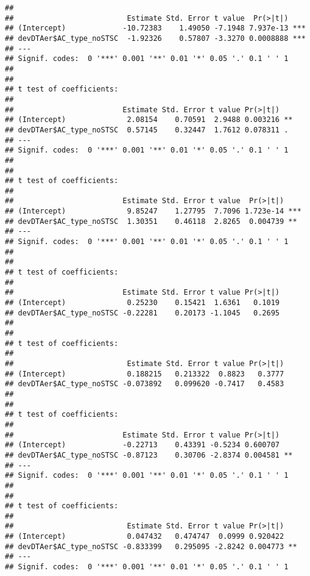 \documentclass[
]{article}
\begin{document}
\begin{verbatim}
## 
##                          Estimate Std. Error t value  Pr(>|t|)    
## (Intercept)             -10.72383    1.49050 -7.1948 7.937e-13 ***
## devDTAer$AC_type_noSTSC  -1.92326    0.57807 -3.3270 0.0008888 ***
## ---
## Signif. codes:  0 '***' 0.001 '**' 0.01 '*' 0.05 '.' 0.1 ' ' 1
## 
## 
## t test of coefficients:
## 
##                         Estimate Std. Error t value Pr(>|t|)   
## (Intercept)              2.08154    0.70591  2.9488 0.003216 **
## devDTAer$AC_type_noSTSC  0.57145    0.32447  1.7612 0.078311 . 
## ---
## Signif. codes:  0 '***' 0.001 '**' 0.01 '*' 0.05 '.' 0.1 ' ' 1
## 
## 
## t test of coefficients:
## 
##                         Estimate Std. Error t value  Pr(>|t|)    
## (Intercept)              9.85247    1.27795  7.7096 1.723e-14 ***
## devDTAer$AC_type_noSTSC  1.30351    0.46118  2.8265  0.004739 ** 
## ---
## Signif. codes:  0 '***' 0.001 '**' 0.01 '*' 0.05 '.' 0.1 ' ' 1
## 
## 
## t test of coefficients:
## 
##                         Estimate Std. Error t value Pr(>|t|)
## (Intercept)              0.25230    0.15421  1.6361   0.1019
## devDTAer$AC_type_noSTSC -0.22281    0.20173 -1.1045   0.2695
## 
## 
## t test of coefficients:
## 
##                          Estimate Std. Error t value Pr(>|t|)
## (Intercept)              0.188215   0.213322  0.8823   0.3777
## devDTAer$AC_type_noSTSC -0.073892   0.099620 -0.7417   0.4583
## 
## 
## t test of coefficients:
## 
##                         Estimate Std. Error t value Pr(>|t|)   
## (Intercept)             -0.22713    0.43391 -0.5234 0.600707   
## devDTAer$AC_type_noSTSC -0.87123    0.30706 -2.8374 0.004581 **
## ---
## Signif. codes:  0 '***' 0.001 '**' 0.01 '*' 0.05 '.' 0.1 ' ' 1
## 
## 
## t test of coefficients:
## 
##                          Estimate Std. Error t value Pr(>|t|)   
## (Intercept)              0.047432   0.474747  0.0999 0.920422   
## devDTAer$AC_type_noSTSC -0.833399   0.295095 -2.8242 0.004773 **
## ---
## Signif. codes:  0 '***' 0.001 '**' 0.01 '*' 0.05 '.' 0.1 ' ' 1
\end{verbatim}
\end{document}
